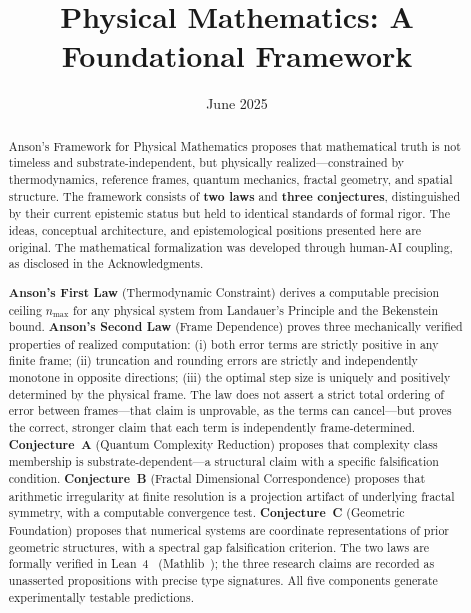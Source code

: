 \documentclass[12pt]{article}
\title{
  {\Large\bfseries\color{titlenavy} Physical Mathematics: A Foundational Framework}
}
\author{}
\date{June 2025}
\theoremstyle{lawstyle}
\theoremstyle{conjstyle}
\theoremstyle{predstyle}
\begin{document}
\maketitle
\thispagestyle{empty}

\begin{abstract}
Anson's Framework for Physical Mathematics proposes that mathematical truth is not timeless
and substrate-independent, but physically realized---constrained by thermodynamics, reference
frames, quantum mechanics, fractal geometry, and spatial structure. The framework consists of
\textbf{two laws} and \textbf{three conjectures}, distinguished by their current epistemic
status but held to identical standards of formal rigor. The ideas, conceptual architecture,
and epistemological positions presented here are original. The mathematical formalization was
developed through human-AI coupling, as disclosed in the Acknowledgments.

\textbf{Anson's First Law} (Thermodynamic Constraint) derives a computable precision ceiling
$n_{\max}$ for any physical system from Landauer's Principle and the Bekenstein bound.
\textbf{Anson's Second Law} (Frame Dependence) proves three mechanically verified properties
of realized computation: (i) both error terms are strictly positive in any finite frame;
(ii) truncation and rounding errors are strictly and independently monotone in opposite
directions; (iii) the optimal step size is uniquely and positively determined by the physical
frame. The law does not assert a strict total ordering of error between frames---that claim
is unprovable, as the terms can cancel---but proves the correct, stronger claim that each
term is independently frame-determined.
\textbf{Conjecture~A} (Quantum Complexity Reduction) proposes that complexity class membership
is substrate-dependent---a structural claim with a specific falsification condition.
\textbf{Conjecture~B} (Fractal Dimensional Correspondence) proposes that arithmetic
irregularity at finite resolution is a projection artifact of underlying fractal symmetry,
with a computable convergence test. \textbf{Conjecture~C} (Geometric Foundation) proposes
that numerical systems are coordinate representations of prior geometric structures, with a
spectral gap falsification criterion. The two laws are formally verified in Lean~4~\cite{lean4} (Mathlib~\cite{mathlib2020});
 the three research claims are recorded as unasserted propositions with precise type signatures. All five components
generate experimentally testable predictions.
\end{abstract}
\end{document}
